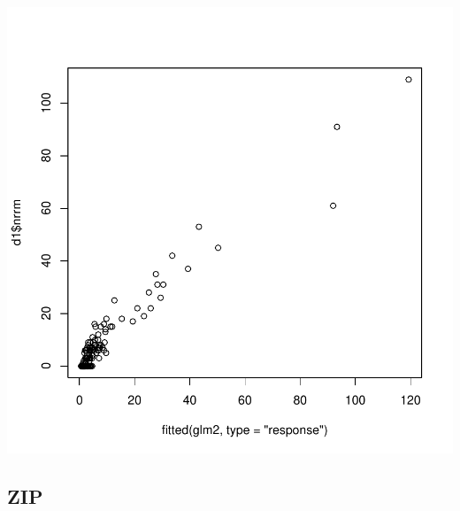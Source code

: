 \documentclass{article}
\begin{document}
\includegraphics{HW08ZIPlogistic-glm2}

\subsection{ZIP}
\end{document}
